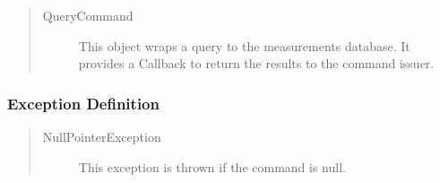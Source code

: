 \begin{quote}
	\begin{description}
		\item[QueryCommand] This object wraps a query to the measurements database. It
		provides a Callback to return the results to the command issuer.
	\end{description} 
\end{quote}

\subsubsection{Exception Definition}

\begin{quote}
	\begin{description}
		\item[NullPointerException] This exception is thrown if the command is null.
	\end{description} 
\end{quote}
